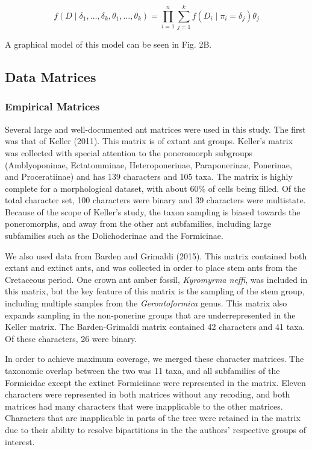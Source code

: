 \documentclass[]{sysbio}
\begin{document}
$$f(D\mid \delta_1,\ldots,\delta_k,\theta_1,\ldots,\theta_k) = \prod_{i=1}^n \sum_{j=1}^k  f(D_i \mid \pi_i = \delta_j)\theta_j$$

A graphical model of this model can be seen in Fig. 2B. 


\subsection{Data Matrices}
\subsubsection{Empirical Matrices}
Several large and well-documented ant matrices were used in this study.
The first was that of Keller (2011). 
This matrix is of extant ant groups. 
Keller's matrix was collected with special attention to the poneromorph subgroups (Amblyoponinae, Ectatomminae,
Heteroponerinae, Paraponerinae, Ponerinae, and Proceratiinae) and has 139 characters and 105 taxa.
The matrix is highly complete for a morphological dataset, with about 60\% of cells being filled.
Of the total character set, 100 characters were binary and 39 characters were multistate.
Because of the scope of Keller's study, the taxon sampling is biased towards the poneromorphs, and away from the other ant subfamilies, including large subfamilies such as the Dolichoderinae and the Formicinae. \par
We also used data from Barden and Grimaldi (2015). 
This matrix contained both extant and extinct ants, and was collected in order to place stem ants from the Cretaceous period.
One crown ant amber fossil, \textit{Kyromyrma neffi}, was included in this matrix, but the key feature of this matrix is the sampling of the stem group, including multiple samples from the \textit{Gerontoformica} genus.
This matrix also expands sampling in the non-ponerine groups that are underrepresented in the Keller matrix.
The Barden-Grimaldi matrix contained 42 characters and 41 taxa. 
Of these characters, 26 were binary.\par
In order to achieve maximum coverage, we merged these character matrices.
The taxonomic overlap between the two was 11 taxa, and all subfamilies of the Formicidae except the extinct Formiciinae were represented in the matrix. 
Eleven characters were represented in both matrices without any recoding, and both matrices had many characters that were inapplicable to the other matrices.
Characters that are inapplicable in parts of the tree were retained in the matrix due to their ability to resolve bipartitions in the the authors' respective groups of interest. \par
\end{document}
